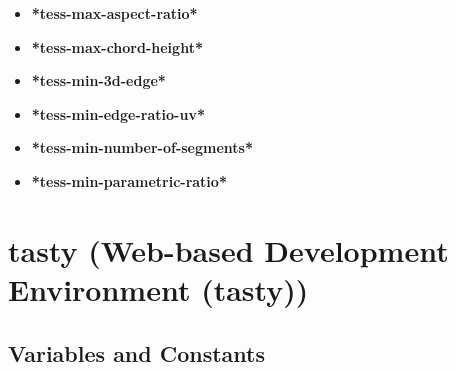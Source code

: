 \documentclass [11pt]{book}
\begin{document}
\begin{itemize}
\item {}
\label{prim:*tess-max-aspect-ratio*}
\textbf{*tess-max-aspect-ratio*}





\item {}
\label{prim:*tess-max-chord-height*}
\textbf{*tess-max-chord-height*}





\item {}
\label{prim:*tess-min-3d-edge*}
\textbf{*tess-min-3d-edge*}





\item {}
\label{prim:*tess-min-edge-ratio-uv*}
\textbf{*tess-min-edge-ratio-uv*}





\item {}
\label{prim:*tess-min-number-of-segments*}
\textbf{*tess-min-number-of-segments*}





\item {}
\label{prim:*tess-min-parametric-ratio*}
\textbf{*tess-min-parametric-ratio*}





\end{itemize}





\section{tasty (Web-based Development Environment (tasty))}

\label{sec:tasty(web-baseddevelopmentenvironment(tasty))}





\subsection{Variables and Constants}

\label{subsec:variablesandconstants}
\end{document}
